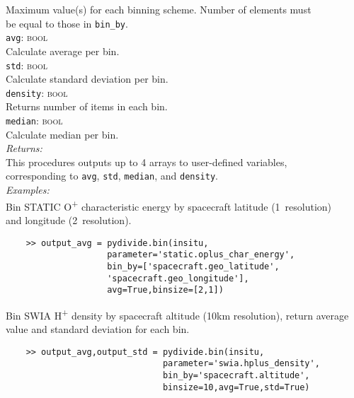 \documentclass{article}
\begin{document}
\indent \indent Maximum value(s) for each binning scheme. Number of elements must\\
\indent \indent be equal to those in \texttt{bin\_by}.\\
\indent \texttt{avg}: \textsc{bool}\\
\indent \indent Calculate average per bin.\\
\indent \texttt{std}: \textsc{bool}\\
\indent \indent Calculate standard deviation per bin.\\
\indent \texttt{density}: \textsc{bool}\\
\indent \indent Returns number of items in each bin.\\
\indent \texttt{median}: \textsc{bool}\\
\indent \indent Calculate median per bin.\\
\textit{Returns:}\\
\indent This procedures outputs up to 4 arrays to user-defined variables,\\
\indent corresponding to \texttt{avg}, \texttt{std}, \texttt{median}, and \texttt{density}.\\
\noindent \textit{Examples:}\\
\indent Bin STATIC O\textsuperscript{+} characteristic energy by spacecraft latitude (1\degree \ resolution) \\
\indent and longitude (2\degree \ resolution).
\vspace{-5mm}
\begin{verbatim}
    >> output_avg = pydivide.bin(insitu,
                    parameter='static.oplus_char_energy',
                    bin_by=['spacecraft.geo_latitude',
                    'spacecraft.geo_longitude'],
                    avg=True,binsize=[2,1])
\end{verbatim}
\noindent \indent Bin SWIA H\textsuperscript{+} density by spacecraft altitude (10km resolution), return average \\
\indent value and standard deviation for each bin.
\vspace{-5mm}
\begin{verbatim}
    >> output_avg,output_std = pydivide.bin(insitu,
                               parameter='swia.hplus_density',
                               bin_by='spacecraft.altitude',
                               binsize=10,avg=True,std=True)
\end{verbatim}
\end{document}
